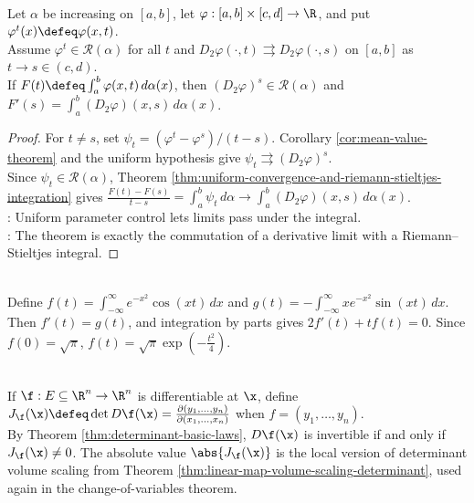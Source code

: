 \begin{theorem} \label{thm:differentiation-under-riemann-stieltjes-integral} \\
Let $\alpha$ be increasing on $[a,b]$, let $\varphi:[a,b]\times[c,d]\to\R$, and put $\varphi^t(x)\defeq\varphi(x,t)$.\\
Assume $\varphi^t\in\mathcal{R}(\alpha)$ for all $t$ and $D_2\varphi(\cdot,t)\rightrightarrows D_2\varphi(\cdot,s)$ on $[a,b]$ as $t\to s\in(c,d)$.\\
If $F(t)\defeq\int_a^b \varphi(x,t)\,d\alpha(x)$, then $(D_2\varphi)^s\in\mathcal{R}(\alpha)$ and $F'(s)=\int_a^b (D_2\varphi)(x,s)\,d\alpha(x)$.
\begin{proof}
For $t\neq s$, set $\psi_t=(\varphi^t-\varphi^s)/(t-s)$. Corollary \ref{cor:mean-value-theorem} and the uniform hypothesis give $\psi_t\rightrightarrows(D_2\varphi)^s$.\\
Since $\psi_t\in\mathcal{R}(\alpha)$, Theorem \ref{thm:uniform-convergence-and-riemann-stieltjes-integration} gives $\frac{F(t)-F(s)}{t-s}=\int_a^b\psi_t\,d\alpha \longrightarrow \int_a^b(D_2\varphi)(x,s)\,d\alpha(x)$.\\
: Uniform parameter control lets limits pass under the integral.\\
: The theorem is exactly the commutation of a derivative limit with a Riemann--Stieltjes integral.
\end{proof}
\end{theorem}

\begin{example} \label{ex:gaussian-fourier-integral-differentiation} \\
Define $f(t)=\int_{-\infty}^{\infty}e^{-x^2}\cos(xt)\,dx$ and $g(t)=-\int_{-\infty}^{\infty}xe^{-x^2}\sin(xt)\,dx$.\\
Then $f'(t)=g(t)$, and integration by parts gives $2f'(t)+tf(t)=0$. Since $f(0)=\sqrt{\pi}$, $f(t)=\sqrt{\pi}\exp\!\left(-\frac{t^2}{4}\right)$.
\end{example}

\begin{definition} \label{def:jacobian-determinant} \\
If $\f:E\subseteq\R^n\to\R^n$ is differentiable at $\x$, define $J_{\f}(\x)\defeq \det D\f(\x) =\frac{\partial(y_1,\ldots,y_n)}{\partial(x_1,\ldots,x_n)}$ when $f=(y_1,\ldots,y_n)$.\\
By Theorem \ref{thm:determinant-basic-laws}, $D\f(\x)$ is invertible if and only if $J_{\f}(\x)\neq0$. The absolute value $\abs{J_{\f}(\x)}$ is the local version of determinant volume scaling from Theorem \ref{thm:linear-map-volume-scaling-determinant}, used again in the change-of-variables theorem.
\end{definition}
